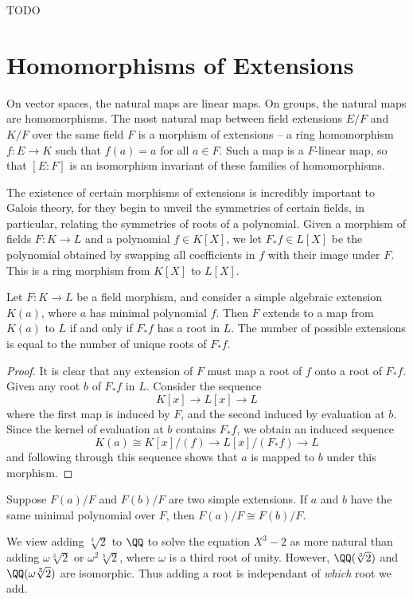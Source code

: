 TODO

\section{Homomorphisms of Extensions}

On vector spaces, the natural maps are linear maps. On groups, the natural maps are homomorphisms. The most natural map between field extensions $E/F$ and $K/F$ over the same field $F$ is a morphism of extensions -- a ring homomorphism $f: E \to K$ such that $f(a) = a$ for all $a \in F$. Such a map is a $F$-linear map, so that $[E:F]$ is an isomorphism invariant of these families of homomorphisms.

The existence of certain morphisms of extensions is incredibly important to Galois theory, for they begin to unveil the symmetries of certain fields, in particular, relating the symmetries of roots of a polynomial. Given a morphism of fields $F: K \to L$ and a polynomial $f \in K[X]$, we let $F_*f \in L[X]$ be the polynomial obtained by swapping all coefficients in $f$ with their image under $F$. This is a ring morphism from $K[X]$ to $L[X]$.

\begin{lemma}
    Let $F:K \to L$ be a field morphism, and consider a simple algebraic extension $K(a)$, where $a$ has minimal polynomial $f$. Then $F$ extends to a map from $K(a)$ to $L$ if and only if $F_*f$ has a root in $L$. The number of possible extensions is equal to the number of unique roots of $F_* f$.
\end{lemma}
\begin{proof}
    It is clear that any extension of $F$ must map a root of $f$ onto a root of $F_* f$. Given any root $b$ of $F_* f$ in $L$. Consider the sequence
    \[ K[x] \to L[x] \to L \]
    where the first map is induced by $F$, and the second induced by evaluation at $b$. Since the kernel of evaluation at $b$ contains $F_* f$, we obtain an induced sequence
    \[ K(a) \cong K[x]/(f) \to L[x]/(F_* f) \to L \]
    and following through this sequence shows that $a$ is mapped to $b$ under this morphism.
\end{proof}

\begin{corollary}
	Suppose $F(a)/F$ and $F(b)/F$ are two simple extensions. If $a$ and $b$ have the same minimal polynomial over $F$, then $F(a)/F \cong F(b)/F$.
\end{corollary}

We view adding $\sqrt[3]{2}$ to $\QQ$ to solve the equation $X^3 - 2$ as more natural than adding $\omega \sqrt[3]{2}$ or $\omega^2 \sqrt[3]{2}$, where $\omega$ is a third root of unity. However, $\QQ(\sqrt[3]{2})$ and $\QQ(\omega \sqrt[3]{2})$ are isomorphic. Thus adding a root is independant of \emph{which} root we add.

